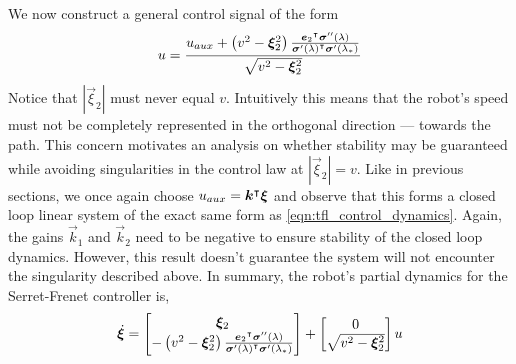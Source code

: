We now construct a general control signal of the form
\begin{equation*}
    u = \frac{u_{aux} + \left(v^2 - \bm{\xi}_2^2\right) \frac{{\bm{e}_2}^{\intercal}\bm{\sigma}''(\lambda)}{{\bm{\sigma}'(\lambda)}^{\intercal}\bm{\sigma}'(\lambda_*)}}{\sqrt{v^2 - \bm{\xi}_2^2}}
\end{equation*}
Notice that $\left|\vec{\xi}_2\right|$ must never equal $v$. Intuitively this means that the robot's speed must not be completely represented in the orthogonal direction --- towards the path. This concern motivates an analysis on whether stability may be guaranteed while avoiding singularities in the control law at $\left|\vec{\xi}_2\right|=v$. Like in previous sections, we once again choose $u_{aux} = {\bm{k}}^{\intercal}\bm{\xi}$ and observe that this forms a closed loop linear system of the exact same form as \eqref{eqn:tfl_control_dynamics}. Again, the gains $\vec{k}_1$ and $\vec{k}_2$ need to be negative to ensure stability of the closed loop dynamics. However, this result doesn't guarantee the system will not encounter the singularity described above. In summary, the robot's partial dynamics for the Serret-Frenet controller is,
\begin{equation*}
    \dot{\bm{\xi}} =
        \begin{bmatrix}
            \bm{\xi}_2 \\
            -\left(v^2 - \bm{\xi}_2^2\right) \frac{{\bm{e}_2}^{\intercal}\bm{\sigma}''(\lambda)}{{\bm{\sigma}'(\lambda)}^{\intercal}\bm{\sigma}'(\lambda_*)}
        \end{bmatrix}
        +
        \begin{bmatrix}
            0 \\
            \sqrt{v^2 - \bm{\xi}_2^2}
        \end{bmatrix}
        u
\end{equation*}

